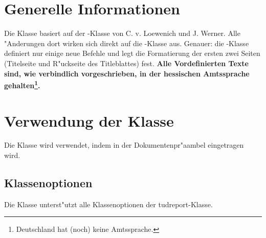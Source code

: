 \section{Generelle Informationen}
    Die Klasse basiert auf der -Klasse von C. v. Loewenich und
    J. Werner. Alle "Anderungen dort wirken sich direkt auf die
    -Klasse aus. Genauer: die -Klasse definiert nur einige
    neue Befehle und legt die Formatierung der ersten zwei Seiten (Titelseite
    und R"uckseite des Titleblattes) fest. \textbf{Alle Vordefinierten Texte sind, wie verbindlich vorgeschrieben, in der hessischen Amtssprache
    gehalten\footnote{Deutschland hat (noch) keine Amtssprache.}.}

  \section{Verwendung der Klasse}
    Die Klasse wird verwendet, indem in der Dokumentenpr"aambel
    eingetragen wird.

  \subsection{Klassenoptionen}
    Die Klasse unterst"utzt alle Klassenoptionen der tudreport-Klasse.

